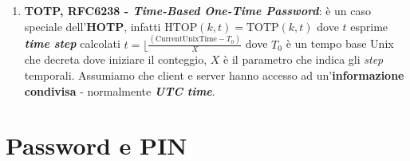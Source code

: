 \begin{flushleft}
\begin{enumerate}[nosep]
    \item \textbf{TOTP, RFC6238 - \textit{Time-Based One-Time Password}}: è un caso speciale dell'\textbf{HOTP}, infatti $\text{HTOP}(k, t) = \text{TOTP}(k, t)$ dove $t$ esprime \textbf{\textit{time step}} calcolati $t = \lfloor \frac{(\text{CurrentUnixTime} - T_0)}{X}$ dove $T_0$ è un tempo base Unix che decreta dove iniziare il conteggio, $X$ è il parametro che indica gli \textit{step} temporali. Assumiamo che client e server hanno accesso ad un'\textbf{informazione condivisa} - normalmente \textbf{\textit{UTC time}}.
    \end{enumerate}
\end{flushleft}

\section{Password e PIN}

